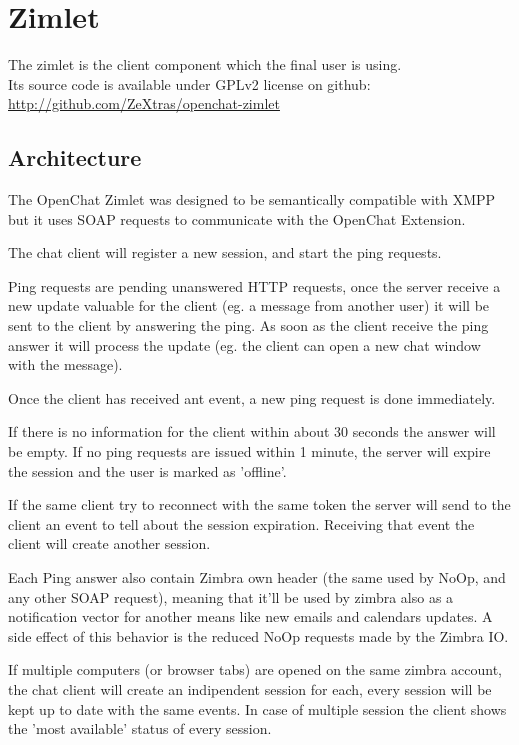 \section{Zimlet}
The zimlet is the client component which the final user is using.\\
Its source code is available under GPLv2 license on github: \url{http://github.com/ZeXtras/openchat-zimlet}

\subsection{Architecture}
The OpenChat Zimlet was designed to be semantically compatible with XMPP but it uses SOAP requests to communicate with
 the OpenChat Extension.

The chat client will register a new session, and start the ping requests.

Ping requests are pending unanswered HTTP requests, once the server receive a new update valuable for the client (eg.
 a message from another user) it will be sent to the client by answering the ping. As soon as the client receive
 the ping answer it will process the update (eg. the client can open a new chat window with the message).

Once the client has received ant event, a new ping request is done immediately.

If there is no information for the client within  about 30 seconds the answer will be empty. If no ping requests are issued
 within 1 minute, the server will expire the session and the user is marked as 'offline'.

If the same client try to reconnect with the same token the server will send to the client an event to tell about the session
 expiration. Receiving that event the client will create another session.

Each Ping answer also contain Zimbra own header (the same used by NoOp, and any other SOAP request), meaning that it'll
 be used by zimbra also as a notification vector for another means like new emails and calendars updates.
 A side effect of this behavior is the reduced NoOp requests made by the Zimbra IO.

If multiple computers (or browser tabs) are opened on the same zimbra account, the chat client will create an indipendent
 session for each, every session will be kept up to date with the same events. In case of multiple session
 the client shows the 'most available' status of every session.

